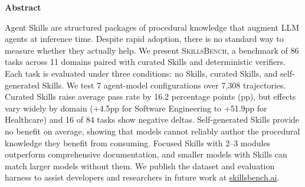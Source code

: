 \documentclass{article}
\theoremstyle{plain}
\theoremstyle{definition}
\theoremstyle{remark}
\newcommand{\benchmarkName}{\textsc{SkillsBench}}
\begin{document}


  \vskip 0.15in

\begin{center}
\begin{minipage}{0.92\textwidth}
\centerline{\textbf{\large Abstract}}
\vskip 0.1in
\small
Agent Skills are structured packages of procedural knowledge that augment LLM agents at inference time. Despite rapid adoption, there is no standard way to measure whether they actually help. We present \benchmarkName{}, a benchmark of 86 tasks across 11 domains paired with curated Skills and deterministic verifiers. Each task is evaluated under three conditions: no Skills, curated Skills, and self-generated Skills. We test 7 agent-model configurations over 7,308 trajectories. Curated Skills raise average pass rate by 16.2 percentage points (pp), but effects vary widely by domain (+4.5pp for Software Engineering to +51.9pp for Healthcare) and 16 of 84 tasks show negative deltas. Self-generated Skills provide no benefit on average, showing that models cannot reliably author the procedural knowledge they benefit from consuming. Focused Skills with 2--3 modules outperform comprehensive documentation, and smaller models with Skills can match larger models without them. We publish the dataset and evaluation harness to assist developers and researchers in future work at \href{https://www.skillsbench.ai/}{skillsbench.ai}.
\end{minipage}
\end{center}
\end{document}
